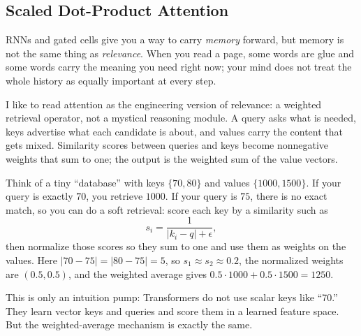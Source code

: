 \subsection{Scaled Dot-Product Attention}
\label{sec:transformers_scaled_dot_product_attention}
\begin{tcolorbox}[summarybox, title={Author's note: attention is a weighted average}]
RNNs and gated cells give you a way to carry \emph{memory} forward, but memory is not the same thing as
\emph{relevance}. When you read a page, some words are glue and some words carry the meaning you need
right now; your mind does not treat the whole history as equally important at every step.

I like to read attention as the engineering version of relevance: a weighted retrieval operator, not a
mystical reasoning module. A query asks what is needed, keys advertise what each candidate is about, and
values carry the content that gets mixed. Similarity scores between queries and keys become nonnegative
weights that sum to one; the output is the weighted sum of the value vectors.
\end{tcolorbox}

\begin{tcolorbox}[summarybox, title={A tiny analogy: keys, values, and weighted retrieval}]
Think of a tiny ``database'' with keys \(\{70,80\}\) and values \(\{1000,1500\}\). If your query is exactly \(70\), you retrieve \(1000\). If your query is \(75\), there is no exact match, so you can do a soft retrieval: score each key by a similarity such as
\[
s_i = \frac{1}{|k_i-q|+\epsilon},
\]
then normalize those scores so they sum to one and use them as weights on the values. Here \(|70-75|=|80-75|=5\), so \(s_1\approx s_2\approx 0.2\), the normalized weights are \((0.5,0.5)\), and the weighted average gives \(0.5\cdot 1000 + 0.5\cdot 1500 = 1250\).
\par\smallskip
This is only an intuition pump: Transformers do not use scalar keys like ``70.'' They learn vector keys and queries and score them in a learned feature space. But the weighted-average mechanism is exactly the same.
\end{tcolorbox}

